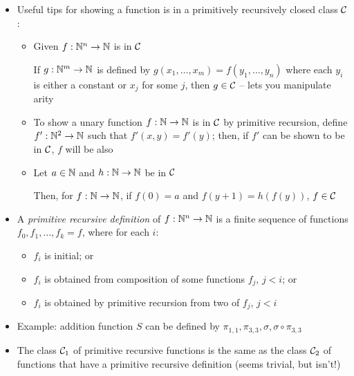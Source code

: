 \begin{itemize}
	\newpage
	
	\item Useful tips for showing a function is in a primitively recursively closed class $ \mathcal{C} $:
	
	
	\begin{itemize}
		
		\item Given $ f: \mathbb{N}^n \to \mathbb{N} $ is in $ \mathcal{C} $
		
		If $ g: \mathbb{N}^m \to \mathbb{N} $ is defined by $ g(x_1, \dots, x_m) = f(y_1, \dots, y_n) $ where each $ y_i $ is either a constant or $ x_j $ for some $ j $, then $ g \in \mathcal{C} $ -- lets you manipulate arity
		
		\item To show a unary function $ f: \mathbb{N} \to \mathbb{N} $ is in $ \mathcal{C} $ by primitive recursion, define $ f': \mathbb{N}^2 \to \mathbb{N} $ such that $ f'(x, y) = f'(y) $; then, if $ f' $ can be shown to be in $ \mathcal{C} $, $ f $ will be also
		
		\item Let $ a \in \mathbb{N} $ and $ h: \mathbb{N} \to \mathbb{N} $ be in $ \mathcal{C} $
		
		Then, for $ f: \mathbb{N} \to \mathbb{N} $, if $ f(0) = a $ and $ f(y + 1) = h(f(y)) $, $ f \in \mathcal{C} $
		
	\end{itemize}

	\item A \textit{primitive recursive definition} of $ f: \mathbb{N}^n \to \mathbb{N} $ is a finite sequence of functions $ f_0, f_1, \dots, f_k = f $, where for each $ i $:
	
	\begin{itemize}
		
		\item $ f_i $ is initial; or
		
		\item $ f_i $ is obtained from composition of some functions $ f_j $, $ j < i $; or
		
		\item $ f_i $ is obtained by primitive recursion from two of $ f_j $, $ j < i $
		
	\end{itemize}

	\item Example: addition function $ S $ can be defined by $ \pi_{1, 1}, \pi_{3, 3}, \sigma, \sigma \circ \pi_{3, 3} $
	
	\item The class $ \mathcal{C}_1 $ of primitive recursive functions is the same as the class $ \mathcal{C}_2 $ of functions that have a primitive recursive definition (seems trivial, but isn't!)
	

\end{itemize}
